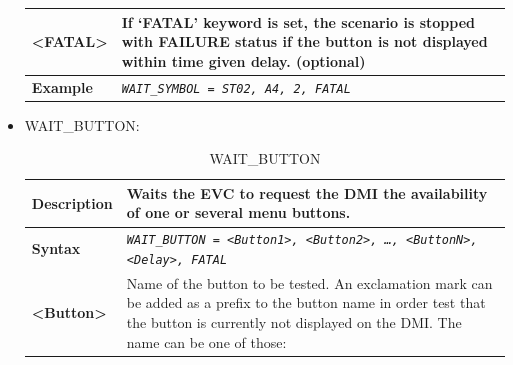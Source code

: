 \documentclass{template/openetcs}
\begin{document}
\begin{itemize}
\begin{longtable}{|l|l|}
					\begin{minipage}[t]{0.22\linewidth} \textbf{<FATAL>} \end{minipage}
				&	\begin{minipage}[t]{0.78\linewidth} If ‘FATAL’ keyword is set, the scenario is stopped with FAILURE status if the button is not displayed within time given delay. (optional) \end{minipage} \\
				
				\hline
															
					\begin{minipage}[t]{0.22\linewidth} \textbf{Example} \end{minipage}
				&	\begin{minipage}[t]{0.78\linewidth} \emph{\texttt{WAIT\_SYMBOL = ST02, A4, 2, FATAL}} \end{minipage} \\
				
				\hline \hline
				
			\end{longtable}
			
		\item WAIT\_BUTTON:
		
			\begin{longtable}{|l|l|}
				\caption{WAIT\_BUTTON}\\ 
				\hline
				
					\begin{minipage}[t]{0.22\linewidth} \textbf{Description} \end{minipage} 
				&	\begin{minipage}[t]{0.78\linewidth} Waits the EVC to request the DMI the availability of one or several menu buttons. \end{minipage} \\
				
				\hline
								
					\begin{minipage}[t]{0.22\linewidth} \textbf{Syntax}	\end{minipage}
				&	\begin{minipage}[t]{0.78\linewidth} \emph{\texttt{WAIT\_BUTTON = <Button1>, <Button2>, …, <ButtonN>, <Delay>, FATAL}} \end{minipage} \\
				
				\hline
				
					\multirow{1}{*}{ \begin{minipage}[t]{0.22\linewidth} \textbf{<Button>}	\end{minipage} }
				&	\begin{minipage}[t]{0.78\linewidth} Name of the button to be tested. An exclamation mark can be added as a prefix to the button name in order test that the button is currently not displayed on the DMI. The name can be one of those:\end{minipage} \\
				

\end{longtable}
\end{itemize}
\end{document}
